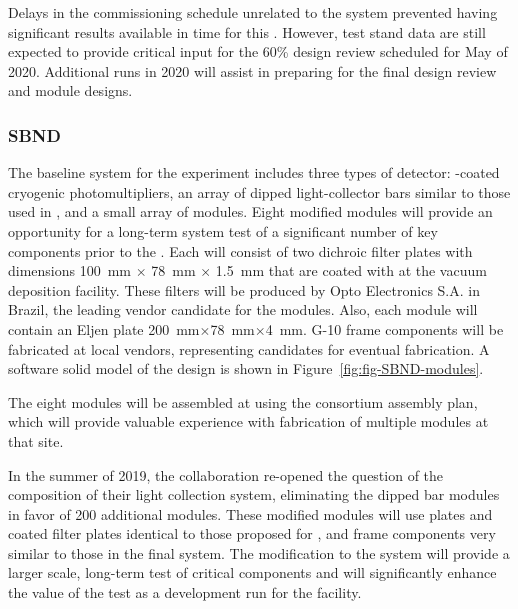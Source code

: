 Delays in the  commissioning schedule unrelated to the  system prevented having significant results available in time for this . However, test stand data are still expected to provide critical input for the 60\% design review scheduled for May of 2020. Additional runs in 2020 will assist in preparing for the final design review and  module designs.


\subsubsection{SBND}
\label{sec:valid-sbnd}

The baseline  system for the  experiment includes three types of detector:  -coated cryogenic photomultipliers, an array of dipped light-collector bars similar to those used in , and a small array of  modules.  Eight modified  modules will provide an opportunity for a long-term system test of a significant number of key components prior to the   .  Each   will consist of two dichroic filter plates with dimensions \SI{100}{mm} $\times$ \SI{78}{mm} $\times$ \SI{1.5}{mm}
 that are coated with  at the  vacuum deposition facility.  These filters will be produced by Opto Electronics S.A. in Brazil, the leading vendor candidate for the   modules.  Also, each  module will contain an Eljen  plate  
\SI{200}{mm}$\times$\SI{78}{mm}$\times$\SI{4}{mm}. \frfour G-10 frame components will be fabricated at local vendors, representing candidates for eventual  fabrication.  A software solid model of the design is shown in Figure~\ref{fig:fig-SBND-modules}.

The eight   modules will be assembled at  using the   consortium assembly plan,
which will provide valuable experience with fabrication of multiple modules at that site.


In the summer of 2019, the  collaboration re-opened the question of the composition of their light collection system, eliminating the dipped bar modules in favor of \num{200} additional  modules.  These modified modules will use  plates and coated filter plates identical to those proposed for , and frame components very similar to those in the final   system.  The modification to the  system will provide a larger scale, long-term test of critical  components and will significantly enhance the value of the test as a development run for the  facility.


